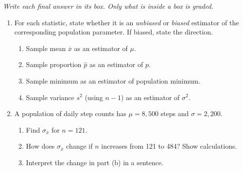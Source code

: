 \documentclass[10pt]{article}
\begin{document}
{\small\itshape Write each final answer in its box. Only what is inside a box is graded.}\par

\vspace{0.15in}

\begin{enumerate}

  \item For each statistic, state whether it is an \emph{unbiased} or \emph{biased}
        estimator of the corresponding population parameter. If biased, state the direction.
        \begin{enumerate}[label=\alph*.]
          \item Sample mean $\bar{x}$ as an estimator of $\mu$.
                \gradedright{\gradedblank[id=hw1a, type=short, points=1, answer=unbiased, check=text]{2.2in}{0.17in}}
          \item Sample proportion $\hat{p}$ as an estimator of $p$.
                \gradedright{\gradedblank[id=hw1b, type=short, points=1, answer=unbiased, check=text]{2.2in}{0.17in}}
          \item Sample minimum as an estimator of population minimum.
                \gradedright{\gradedblank[id=hw1c, type=short, points=1, answer={biased high}, check=text]{2.2in}{0.17in}}
          \item Sample variance $s^2$ (using $n-1$) as an estimator of $\sigma^2$.
                \gradedright{\gradedblank[id=hw1d, type=short, points=1, answer=unbiased, check=text]{2.2in}{0.17in}}
        \end{enumerate}

  \item A population of daily step counts has $\mu = 8{,}500$ steps and $\sigma = 2{,}200$.
        \begin{enumerate}[label=\alph*.]
          \item Find $\sigma_{\bar{x}}$ for $n = 121$.
                \vspace{0.5in}
          \item How does $\sigma_{\bar{x}}$ change if $n$ increases from 121 to 484?
                Show calculations.
                \vspace{0.6in}
          \boxguard[17]
          \item Interpret the change in part (b) in a sentence.
        \end{enumerate}


\end{enumerate}
\end{document}
